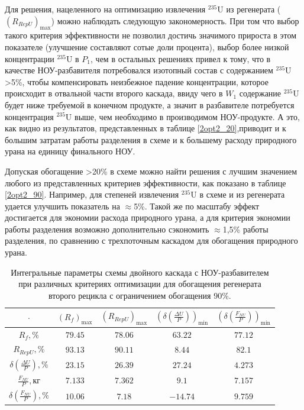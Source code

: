 Для решения, нацеленного на оптимизацию извлечения $^{235}$U из регенерата ($(R_{RepU})_\text{max}$) можно наблюдать следующую закономерность. При том что выбор такого критерия эффективности не позволил достичь значимого прироста в этом показателе (улучшение составляют сотые доли процента), выбор более низкой концентрации $^{235}$U в $P_{1}$, чем в остальных решениях привел к тому, что в качестве НОУ-разбавителя потребовался изотопный состав с содержанием $^{235}$U >5\%, чтобы компенсировать неизбежное падение концентрации, которое происходит в отвальной части второго каскада, ввиду чего в $W_{1}$ содержание $^{235}$U будет ниже требуемой в конечном продукте, а значит в разбавителе потребуется концентрация $^{235}$U выше, чем необходимо в производимом НОУ-продукте. А это, как видно из результатов, представленных в таблице \ref{2opt2_20},приводит и к большим затратам работы разделения в схеме и к большему расходу природного урана на единицу финального НОУ. 

Допуская обогащение >20\% в схеме можно найти решения с лучшим значением любого из представленных критериев эффективности, как показано в таблице \ref{2opt2_90}. Например, для степеней извлечения $^{235}$U в схеме и из регенерата удается улучшить показатель на $\approx$5\%. Такой же по масштабу эффект достигается для экономии расхода природного урана, а для критерия экономии работы разделения возможно дополнительно сэкономить $\approx$1,5\% работы разделения, по сравнению с трехпоточным каскадом для обогащения природного урана.

\begin{table}
    \begin{tabular}{ccccc}
        $\cdot$ & $(R_f)_\text{max}$ & $(R_{RepU})_\text{max}$ & $(\delta(\frac{\Delta U}{P}))_\text{min}$ & $(\delta(\frac{F_{NU}}{P}))_\text{min}$\\ \hline
        $R_f, \%$  & $79.45$ & $78.06$ & $63.22$ & $77.12$\\ \hline
        $R_{RepU}, \%$  & $93.13$ & $90.11$ & $8.44$ & $82.1$\\ \hline
        $\delta(\frac{\Delta U}{P}), \%$ & $23.15$ & $26.39$ & $27.24$ & $4.273$\\ \hline
        $\frac{F_{NU}}{P}, \text{кг}$ & $7.133$ & $7.362$ & $9.1$ & $7.157$\\ \hline
        $\delta(\frac{F_{NU}}{P}), \%$ & $10.06$ & $7.18$ & $-14.74$ & $9.759$\\ \hline
    \end{tabular}
    \caption{Интегральные параметры схемы двойного каскада с НОУ-разбавителем при различных критериях оптимизации для обогащения регенерата второго рецикла с ограничением обогащения 90\%.{\label{2opt2_90_int}}}
\end{table}

